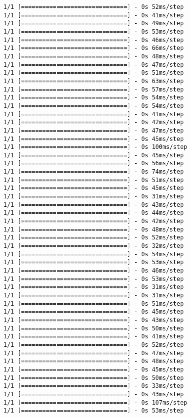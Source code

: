 \documentclass[11pt]{article}
\begin{document}
\begin{Verbatim}[commandchars=\\\{\}]
1/1 [==============================] - 0s 52ms/step
1/1 [==============================] - 0s 41ms/step
1/1 [==============================] - 0s 49ms/step
1/1 [==============================] - 0s 53ms/step
1/1 [==============================] - 0s 46ms/step
1/1 [==============================] - 0s 66ms/step
1/1 [==============================] - 0s 48ms/step
1/1 [==============================] - 0s 47ms/step
1/1 [==============================] - 0s 51ms/step
1/1 [==============================] - 0s 63ms/step
1/1 [==============================] - 0s 57ms/step
1/1 [==============================] - 0s 54ms/step
1/1 [==============================] - 0s 54ms/step
1/1 [==============================] - 0s 41ms/step
1/1 [==============================] - 0s 42ms/step
1/1 [==============================] - 0s 47ms/step
1/1 [==============================] - 0s 45ms/step
1/1 [==============================] - 0s 100ms/step
1/1 [==============================] - 0s 45ms/step
1/1 [==============================] - 0s 56ms/step
1/1 [==============================] - 0s 74ms/step
1/1 [==============================] - 0s 51ms/step
1/1 [==============================] - 0s 45ms/step
1/1 [==============================] - 0s 31ms/step
1/1 [==============================] - 0s 43ms/step
1/1 [==============================] - 0s 44ms/step
1/1 [==============================] - 0s 42ms/step
1/1 [==============================] - 0s 48ms/step
1/1 [==============================] - 0s 52ms/step
1/1 [==============================] - 0s 32ms/step
1/1 [==============================] - 0s 54ms/step
1/1 [==============================] - 0s 53ms/step
1/1 [==============================] - 0s 46ms/step
1/1 [==============================] - 0s 53ms/step
1/1 [==============================] - 0s 31ms/step
1/1 [==============================] - 0s 31ms/step
1/1 [==============================] - 0s 51ms/step
1/1 [==============================] - 0s 45ms/step
1/1 [==============================] - 0s 43ms/step
1/1 [==============================] - 0s 50ms/step
1/1 [==============================] - 0s 41ms/step
1/1 [==============================] - 0s 52ms/step
1/1 [==============================] - 0s 47ms/step
1/1 [==============================] - 0s 48ms/step
1/1 [==============================] - 0s 45ms/step
1/1 [==============================] - 0s 50ms/step
1/1 [==============================] - 0s 33ms/step
1/1 [==============================] - 0s 43ms/step
1/1 [==============================] - 0s 107ms/step
1/1 [==============================] - 0s 53ms/step

\end{Verbatim}
\end{document}
